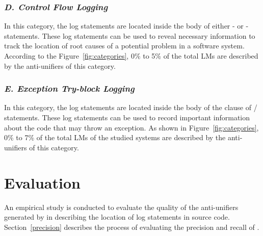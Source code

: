 \subsubsection{\emph{D. Control Flow Logging}}  \label{Exception try-block logging}
In this category, the log statements are located inside the body of either - or - statements. These log statements can be used to reveal necessary information to track the location of root causes of a potential problem in a software system. According to the Figure~\ref{fig:categories}, 0\% to 5\% of the total LMs are described by the anti-unifiers of this category.


\subsubsection{\emph{E. Exception Try-block Logging}}  \label{Exception try-block logging}
In this category, the log statements are located inside the body of the  clause of / statements. These log statements can be used to record important information about the code that may throw an exception. As shown in Figure~\ref{fig:categories}, 0\% to 7\% of the total LMs of the studied systems are described by the anti-unifiers of this category.


\section{Evaluation}  \label{evaluation}

An empirical study is conducted to evaluate the quality of the anti-unifiers generated by  in describing the location of log statements in source code. Section~\ref{precision} describes the process of evaluating the precision and recall of .


